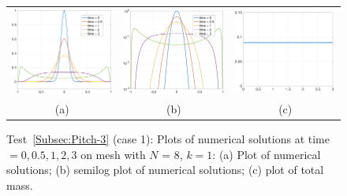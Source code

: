\documentclass[preprint,11pt]{elsarticle}
\begin{document}
\begin{figure}[H]
\centering
\begin{tabular}{ccc}
\includegraphics[width=.3\textwidth]{./NumFig/Test4-3-1-L8D2}
&\includegraphics[width=.3\textwidth]{./NumFig/Test4-3-1-L8D2-log}
&\includegraphics[width=.3\textwidth]{./NumFig/Test4-3-k1-1-Con_v2}\\
(a) & (b) &(c)
\end{tabular}
\caption{Test~\ref{Subsec:Pitch-3} (case 1): Plots of numerical solutions at time $=0,0.5,1,2,3$ on mesh with $N$ = 8, $k=1$: (a) Plot of numerical solutions; (b) semilog plot of numerical solutions; (c) plot of total mass.}\label{Fig:Pitch-3-1}
\end{figure}
\end{document}
